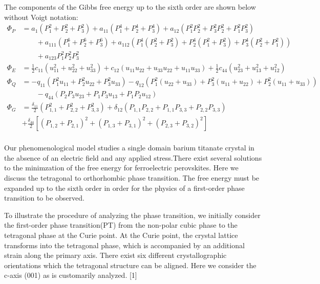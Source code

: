 \documentclass{article}
\begin{document}
The components of the Gibbs free energy up to the sixth order are shown below without Voigt notation:
\begin{align*}
\Phi_{P} &= a_1 \left(P_1^2+P_2^2+P_3^2\right)+a_{11} \left(P_1^4+P_2^4+P_3^4\right)+a_{12} \left(P_1^2 P_2^2+P_3^2 P_2^2+P_1^2 P_3^2\right) \\ 
& \qquad + a_{111} \left(P_1^6+P_2^6+P_3^6\right)+a_{112} \left( P_1^4\left(P_2^2+P_3^2\right)+P_2^4\left(P_1^2+P_3^2\right)+P_3^4 \left(P_2^2+P_1^2\right)\right) \nonumber \\ \nonumber & \qquad + a_{123} P_1^2 P_2^2 P_3^2 \\
\Phi_{E}&=\frac{1}{2} c_{11} \left(u_{11}^2+u_{22}^2+u_{33}^2\right)+ c_{12} \left(u_{11} u_{22}+u_{33} u_{22}+u_{11} u_{33}\right)+\frac{1}{2} c_{44} \left(u_{23}^2+u_{13}^2+u_{12}^2\right) \\
\Phi_{Q} &= -q_{11} \left(P_1^2 u_{11}+P_2^2 u_{22}+P_3^2 u_{33}\right)-q_{12} \left(P_1^2 \left(u_{22}+u_{33}\right)+P_3^2 \left(u_{11}+u_{22}\right)+P_2^2 \left(u_{11}+u_{33}\right)\right) \\
 & \qquad -q_{44} \left(P_2 P_3 u_{23}+P_1 P_3 u_{13}+P_1 P_2 u_{12}\right) \nonumber \\
 \Phi_{G} &= \frac{\delta_{11}}{2}(P_{1,1}^2+P_{2,2}^2+P_{3,3}^2)+\delta_{12}(P_{1,1} P_{2,2}+P_{1,1} P_{3,3}+ P_{2,2} P_{3,3}) \\
 &  +\frac{\delta_{44}}{2}[(P_{1,2}+P_{2,1})^2+(P_{1,3}+P_{3,1})^2+(P_{2,3}+P_{3,2})^2] \\
\end{align*}

Our phenomenological model studies a single domain barium titanate crystal in the absence of an electric field and any applied stress.There exist several solutions to the minimzation of the free energy for ferroelectric perovskites.  Here we discuss the tetragonal to orthorhombic phase transition.  The free energy must be expanded up to the sixth order in order for the physics of a first-order phase transition to be observed.  

To illustrate the procedure of analyzing the phase transition, we initially consider the first-order phase transition(PT) from the non-polar cubic phase to the tetragonal phase at the Curie point.  At the Curie point, the crystal lattice transforms into the tetragonal phase, which is accompanied by an additional strain along the primary axis.  There exist six different crystallographic orientations which the tetragonal structure can be aligned.  Here we consider the c-axis (001) as is customarily analyzed. [1]
\end{document}
